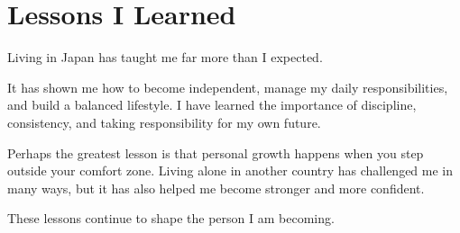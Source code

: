 \section{Lessons I Learned}

Living in Japan has taught me far more than I expected.

It has shown me how to become independent, manage my daily responsibilities, and build a balanced lifestyle. I have learned the importance of discipline, consistency, and taking responsibility for my own future.

Perhaps the greatest lesson is that personal growth happens when you step outside your comfort zone. Living alone in another country has challenged me in many ways, but it has also helped me become stronger and more confident.

These lessons continue to shape the person I am becoming.
